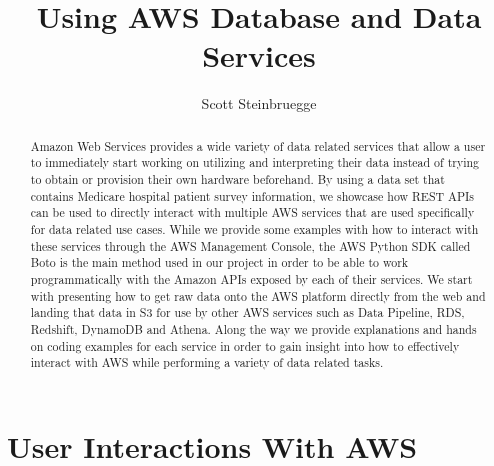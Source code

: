 
\title{Using AWS Database and Data Services}

\author{Scott Steinbruegge}

\renewcommand{\shortauthors}{S. Steinbruegge}

\begin{abstract}
Amazon Web Services provides a wide variety of data related services that 
allow a user to immediately start working on utilizing and interpreting their 
data instead of trying to obtain or provision their own hardware beforehand. 
By using a data set that contains Medicare hospital patient survey 
information, we showcase how REST APIs can be used to directly interact with 
multiple AWS services that are used specifically for data related use cases. 
While we provide some examples with how to interact with these services 
through the AWS Management Console, the AWS Python SDK called Boto is the main 
method used in our project in order to be able to work programmatically with 
the Amazon APIs exposed by each of their services. We start with presenting 
how to get raw data onto the AWS platform directly from the web and landing 
that data in S3 for use by other AWS services such as Data Pipeline, RDS, 
Redshift, DynamoDB and Athena. Along the way we provide explanations and hands 
on coding examples for each service in order to gain insight into how to 
effectively interact with AWS while performing a variety of data related 
tasks. 
\end{abstract}


\maketitle

\section{User Interactions With AWS}

